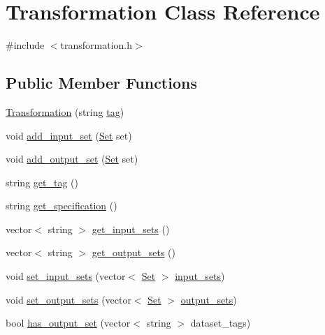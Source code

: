\hypertarget{classTransformation}{}\section{Transformation Class Reference}
\label{classTransformation}


{\ttfamily \#include $<$transformation.\+h$>$}

\subsection*{Public Member Functions}
\begin{DoxyCompactItemize}
\item 
\hyperlink{classTransformation_a7d309ec7b7e612c941982b0b3a484f70}{Transformation} (string \hyperlink{classTransformation_aae5fa5db90050f8bd2f24cce6864fb14}{tag})
\item 
void \hyperlink{classTransformation_a2a2af5b05352dd3d401c7af6027248d0}{add\+\_\+input\+\_\+set} (\hyperlink{classSet}{Set} set)
\item 
void \hyperlink{classTransformation_a63b5bc7696a22e413d95540703738894}{add\+\_\+output\+\_\+set} (\hyperlink{classSet}{Set} set)
\item 
string \hyperlink{classTransformation_a5ad25a244c9506d5bb89cfed8a3667b0}{get\+\_\+tag} ()
\item 
string \hyperlink{classTransformation_adfe87345cdc0ebff5a6212dd9779ec87}{get\+\_\+specification} ()
\item 
vector$<$ string $>$ \hyperlink{classTransformation_a96a5923535ff3663c478fdc0cd7ddc34}{get\+\_\+input\+\_\+sets} ()
\item 
vector$<$ string $>$ \hyperlink{classTransformation_a309852a4fbb5db261a1a6d564c7147c8}{get\+\_\+output\+\_\+sets} ()
\item 
void \hyperlink{classTransformation_a015a16690d152a99ddf482cb56c05e07}{set\+\_\+input\+\_\+sets} (vector$<$ \hyperlink{classSet}{Set} $>$ \hyperlink{classTransformation_a5cff8880aed2eaf0ad3bdc9ad1c86148}{input\+\_\+sets})
\item 
void \hyperlink{classTransformation_a10b3128bcb16deae76746a3179e8e315}{set\+\_\+output\+\_\+sets} (vector$<$ \hyperlink{classSet}{Set} $>$ \hyperlink{classTransformation_ac1a61ff0d71f8ceb2d4338d2abd04f24}{output\+\_\+sets})
\item 
bool \hyperlink{classTransformation_a86424a75814c92796a3dbd5530df7598}{has\+\_\+output\+\_\+set} (vector$<$ string $>$ dataset\+\_\+tags)
\end{DoxyCompactItemize}

